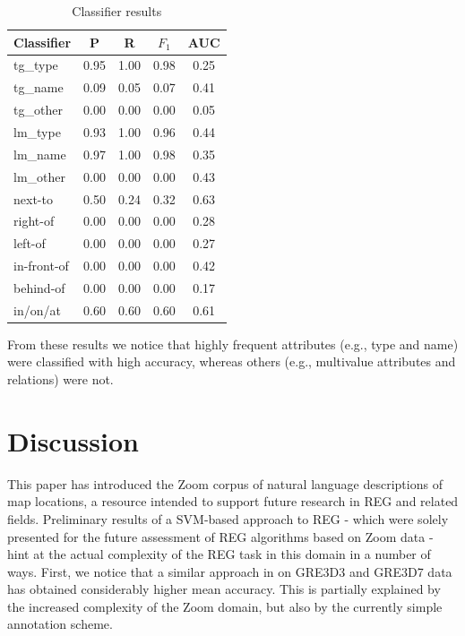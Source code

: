 \documentclass[11pt]{article}
\begin{document}
\begin{table}[ht]
\begin{center}
\footnotesize{
\caption{Classifier results}
\begin{tabular}{l c c c c }
\hline
{{Classifier}}	& {P} & {R} & {$F_{1}$} & {AUC} \\
\hline
{{tg\_type}} 			& 0.95 & 1.00 & 0.98 & 0.25 \\
{{tg\_name}}			& 0.09 & 0.05 & 0.07 & 0.41 \\
{{tg\_other}}			& 0.00 & 0.00 & 0.00 & 0.05 \\                               
{{lm\_type}}			& 0.93 & 1.00 & 0.96 & 0.44 \\                               
{{lm\_name}}			& 0.97 & 1.00 & 0.98 & 0.35 \\                               
{{lm\_other}}			& 0.00 & 0.00 & 0.00 & 0.43 \\                               
{{next-to}}				& 0.50 & 0.24 & 0.32 & 0.63 \\                               
{{right-of}}			& 0.00 & 0.00 & 0.00 & 0.28 \\                               
{{left-of}}				& 0.00 & 0.00 & 0.00 & 0.27 \\                               
{{in-front-of}}		& 0.00 & 0.00 & 0.00 & 0.42 \\                               
{{behind-of}}			& 0.00 & 0.00 & 0.00 & 0.17 \\                               
{{in/on/at}} 			& 0.60 & 0.60 & 0.60 & 0.61 \\                               
\hline                   
\end{tabular}
\label{tab-svm-results}
}
\end{center}
\end{table}
\normalsize

From these results we notice that highly frequent attributes (e.g., type and name) were classified  with high accuracy, whereas others (e.g., multivalue attributes and relations) were not. 

\section{Discussion}
\label{sec-final}

This paper has introduced the Zoom corpus of natural language descriptions of map locations, a resource intended to support future research in REG and related fields. Preliminary results of a SVM-based approach to REG - which were solely presented for the future assessment of REG algorithms based on Zoom data - hint at the actual complexity of the REG task in this domain in a number of ways. First, we notice that a similar approach in \cite{thiago-svm} on GRE3D3 and GRE3D7 data has obtained considerably higher mean accuracy. This is partially explained by the increased complexity of the Zoom domain, but also by the currently  simple annotation scheme.
\end{document}
